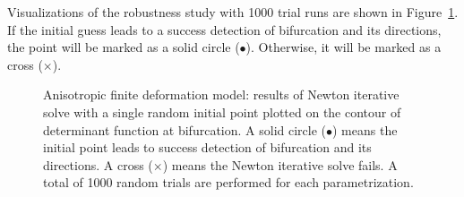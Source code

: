 \documentclass[12pt]{article}
\numberwithin{equation}{section}
\begin{document}
Visualizations of the robustness study with 1000 trial runs are shown 
in Figure~\ref{fig:aniso_uniaxial_robust}. If the initial guess leads 
to a success detection of bifurcation and its directions, the point 
will be marked as a solid circle ($\bullet$). Otherwise, it will be 
marked as a cross ($\times$).

\begin{figure}[H]
   \centering {}   
   \caption{Anisotropic finite deformation model: results of Newton 
   iterative solve with a single random initial point plotted on the 
   contour of determinant function at bifurcation. A solid circle 
   ($\bullet$) means the initial point leads to success detection of 
   bifurcation and its directions. A cross ($\times$) means the Newton 
   iterative solve fails. A total of 1000 random trials are performed 
   for each parametrization.}
   \label{fig:aniso_uniaxial_robust}
 \end{figure}
\end{document}
